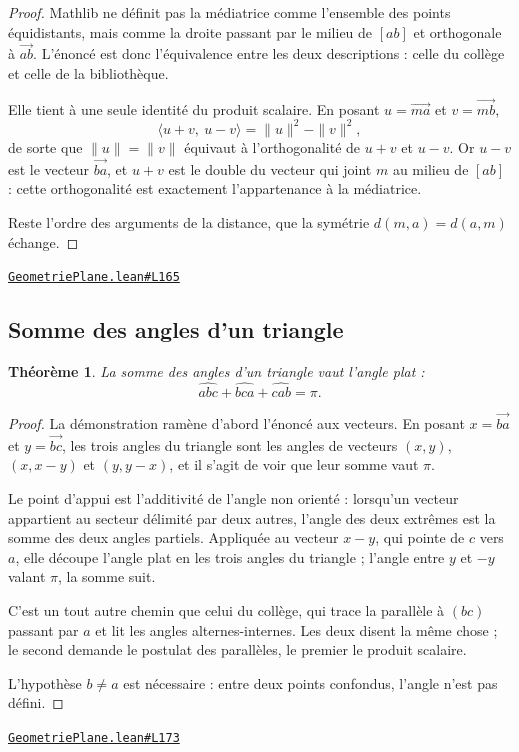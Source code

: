 \documentclass[11pt,a4paper]{article}
\theoremstyle{definition}
\theoremstyle{plain}
\newtheorem{theoreme}{Théorème}
\newcommand{\source}[2]{\par\smallskip\noindent\hfill{\footnotesize\href{#1}{\texttt{#2}}}\par\smallskip}
\begin{document}
\begin{proof}
Mathlib ne définit pas la médiatrice comme l'ensemble des points équidistants, mais comme la
droite passant par le milieu de $[ab]$ et orthogonale à $\vec{ab}$. L'énoncé est donc
l'équivalence entre les deux descriptions : celle du collège et celle de la bibliothèque.

Elle tient à une seule identité du produit scalaire. En posant $u = \vec{ma}$ et
$v = \vec{mb}$,
\[ \langle u + v,\ u - v \rangle = \|u\|^2 - \|v\|^2 , \]
de sorte que $\|u\| = \|v\|$ équivaut à l'orthogonalité de $u + v$ et $u - v$. Or $u - v$
est le vecteur $\vec{ba}$, et $u + v$ est le double du vecteur qui joint $m$ au milieu de
$[ab]$ : cette orthogonalité est exactement l'appartenance à la médiatrice.

Reste l'ordre des arguments de la distance, que la symétrie $d(m, a) = d(a, m)$ échange.
\end{proof}
\source{https://github.com/Commutator-IO/learn-lean/blob/main/courses/01-college/02-geometrie-plane/GeometriePlane.lean\#L165}{GeometriePlane.lean\#L165}

\subsection{Somme des angles d'un triangle}

\begin{theoreme}
La somme des angles d'un triangle vaut l'angle plat :
\[ \widehat{abc} + \widehat{bca} + \widehat{cab} = \pi . \]
\end{theoreme}

\begin{proof}
La démonstration ramène d'abord l'énoncé aux vecteurs. En posant $x = \vec{ba}$ et
$y = \vec{bc}$, les trois angles du triangle sont les angles de vecteurs $(x, y)$,
$(x, x - y)$ et $(y, y - x)$, et il s'agit de voir que leur somme vaut $\pi$.

Le point d'appui est l'additivité de l'angle non orienté : lorsqu'un vecteur appartient au
secteur délimité par deux autres, l'angle des deux extrêmes est la somme des deux angles
partiels. Appliquée au vecteur $x - y$, qui pointe de $c$ vers $a$, elle découpe l'angle
plat en les trois angles du triangle ; l'angle entre $y$ et $-y$ valant $\pi$, la somme
suit.

C'est un tout autre chemin que celui du collège, qui trace la parallèle à $(bc)$ passant par
$a$ et lit les angles alternes-internes. Les deux disent la même chose ; le second demande
le postulat des parallèles, le premier le produit scalaire.

L'hypothèse $b \ne a$ est nécessaire : entre deux points confondus, l'angle n'est pas
défini.
\end{proof}
\source{https://github.com/Commutator-IO/learn-lean/blob/main/courses/01-college/02-geometrie-plane/GeometriePlane.lean\#L173}{GeometriePlane.lean\#L173}
\end{document}
